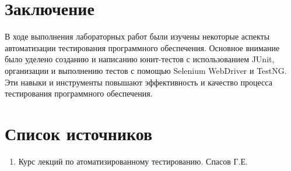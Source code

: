 \documentclass[areasetadvanced]{scrartcl}
\begin{document}
\newpage
\section*{Заключение}
В ходе выполнения лабораторных работ были изучены некоторые аспекты автоматизации тестирования программного обеспечения. Основное внимание было уделено созданию и написанию юнит-тестов с использованием JUnit, организации и выполнению тестов с помощью Selenium WebDriver и TestNG. Эти навыки и инструменты повышают эффективность и качество процесса тестирования программного обеспечения.
\newpage
\section*{Список источников}
\begin{enumerate}
	\item Курс лекций по атоматизированному тестированию. Спасов Г.Е.
\end{enumerate}
\end{document}
